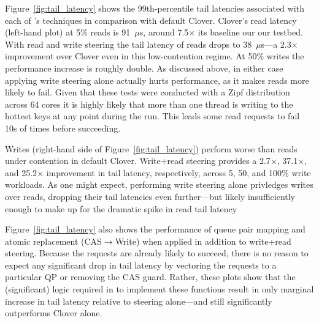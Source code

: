 Figure~\ref{fig:tail_latency} shows the 99th-percentile tail latencies
associated with each of \sword's techniques in comparison with default
Clover. Clover's read latency (left-hand plot) at 5\% reads is
91~$\mu$s, around 7.5$\times$ its baseline our our testbed. With read
and write steering the tail latency of reads drops to 38~$\mu$s---a
2.3$\times$ improvement over Clover even in this low-contention
regime. At 50\% writes the performance increase is roughly double.  As
discussed above, in either case applying write steering alone actually
hurts performance, as it makes reads more likely to fail.
Given that these tests were conducted with a
Zipf distribution across 64 cores it is highly likely that more than
one thread is writing to the hottest keys at any point during the
run. This leads some read requests to fail 10s of times before
succeeding.


Writes (right-hand side of Figure~\ref{fig:tail_latency}) perform
worse than reads under contention in default Clover. Write+read
steering provides a 2.7$\times$, 37.1$\times$, and 25.2$\times$
improvement in tail latency, respectively, across 5, 50, and 100\%
write workloads.  As one might expect, performing write steering alone
privledges writes over reads, dropping their tail latencies even
further---but likely insufficiently enough to make up for the dramatic
spike in read tail latency

Figure~\ref{fig:tail_latency} also shows the performance of queue pair
mapping and atomic replacement (CAS$\rightarrow$Write) when applied in addition
to write+read steering.  Because the requests are already likely to
succeed, there is no reason to expect any significant drop in tail
latency by vectoring the requests to a particular QP or removing the
CAS guard.  Rather, these plots show that the (significant) 
logic required in {\sword} to implement these functions result in only
marginal increase in tail latency relative to steering alone---and still
significantly outperforms Clover alone.



